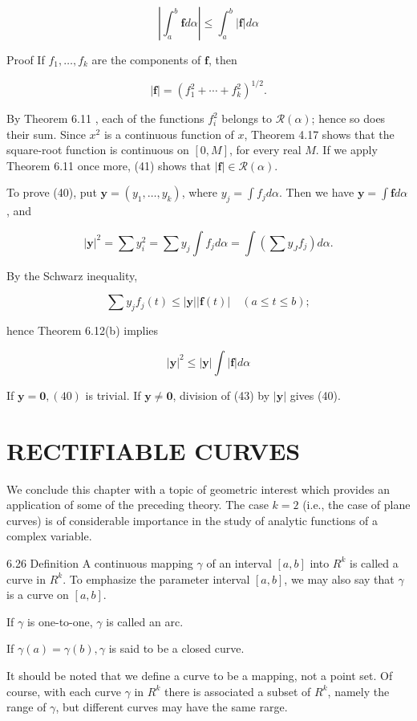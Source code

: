 \documentclass[10pt]{article}
\begin{document}
$$
\left|\int_{a}^{b} \mathbf{f} d \alpha\right| \leq \int_{a}^{b}|\mathbf{f}| d \alpha
$$

Proof If $f_{1}, \ldots, f_{k}$ are the components of $\mathbf{f}$, then

$$
|\mathbf{f}|=\left(f_{1}^{2}+\cdots+f_{k}^{2}\right)^{1 / 2} .
$$

By Theorem 6.11 , each of the functions $f_{i}^{2}$ belongs to $\mathscr{R}(\alpha)$; hence so does their sum. Since $x^{2}$ is a continuous function of $x$, Theorem 4.17 shows that the square-root function is continuous on $[0, M]$, for every real $M$. If we apply Theorem 6.11 once more, (41) shows that $|\mathbf{f}| \in \mathscr{R}(\alpha)$.

To prove (40), put $\mathbf{y}=\left(y_{1}, \ldots, y_{k}\right)$, where $y_{j}=\int f_{j} d \alpha$. Then we have $\mathbf{y}=\int \mathbf{f} d \alpha$, and

$$
|\mathbf{y}|^{2}=\sum y_{i}^{2}=\sum y_{j} \int f_{j} d \alpha=\int\left(\sum y_{J} f_{j}\right) d \alpha .
$$

By the Schwarz inequality,

$$
\sum y_{j} f_{j}(t) \leq|\mathbf{y}||\mathbf{f}(t)| \quad(a \leq t \leq b) ;
$$

hence Theorem 6.12(b) implies

$$
|\mathbf{y}|^{2} \leq|\mathbf{y}| \int|\mathbf{f}| d \alpha
$$

If $\mathbf{y}=\mathbf{0},(40)$ is trivial. If $\mathbf{y} \neq \mathbf{0}$, division of (43) by $|\mathbf{y}|$ gives (40).

\section{RECTIFIABLE CURVES}
We conclude this chapter with a topic of geometric interest which provides an application of some of the preceding theory. The case $k=2$ (i.e., the case of plane curves) is of considerable importance in the study of analytic functions of a complex variable.

6.26 Definition A continuous mapping $\gamma$ of an interval $[a, b]$ into $R^{k}$ is called a curve in $R^{k}$. To emphasize the parameter interval $[a, b]$, we may also say that $\gamma$ is a curve on $[a, b]$.

If $\gamma$ is one-to-one, $\gamma$ is called an arc.

If $\gamma(a)=\gamma(b), \gamma$ is said to be a closed curve.

It should be noted that we define a curve to be a mapping, not a point set. Of course, with each curve $\gamma$ in $R^{k}$ there is associated a subset of $R^{k}$, namely the range of $\gamma$, but different curves may have the same rarge.
\end{document}
